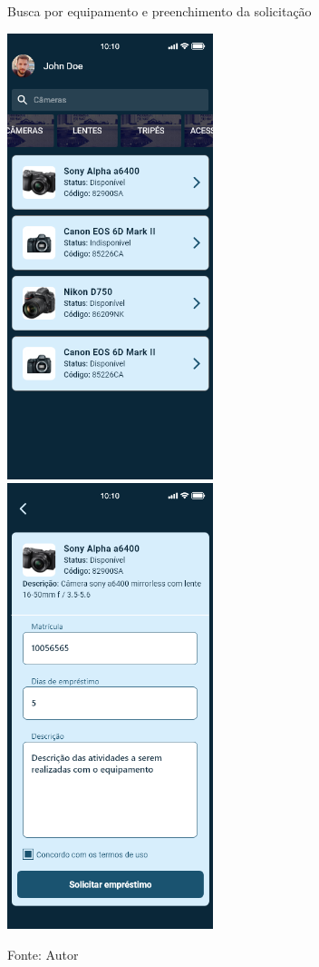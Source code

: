    \begin{figure}[tb]
    \begin{center}
    \caption{Busca por equipamento e preenchimento da solicitação}
    \includegraphics[width=6cm]{imagem/Solicitante on search.png} \quad
    \includegraphics[width=6cm]{imagem/Solicitante on loan.png}
    \caption*{Fonte: Autor}
    \label{figure:solicitante}
    \end{center}
    \end{figure}
    
